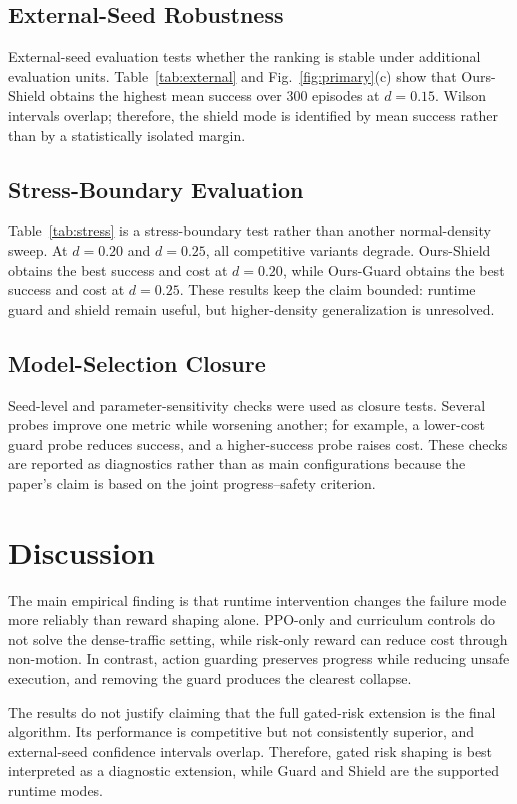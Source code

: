 \documentclass[conference,a4paper]{IEEEtran}
\begin{document}
\subsection{External-Seed Robustness}
External-seed evaluation tests whether the ranking is stable under additional evaluation units. Table~\ref{tab:external} and Fig.~\ref{fig:primary}(c) show that Ours-Shield obtains the highest mean success over 300 episodes at $d=0.15$. Wilson intervals overlap; therefore, the shield mode is identified by mean success rather than by a statistically isolated margin.


\subsection{Stress-Boundary Evaluation}
Table~\ref{tab:stress} is a stress-boundary test rather than another normal-density sweep. At $d=0.20$ and $d=0.25$, all competitive variants degrade. Ours-Shield obtains the best success and cost at $d=0.20$, while Ours-Guard obtains the best success and cost at $d=0.25$. These results keep the claim bounded: runtime guard and shield remain useful, but higher-density generalization is unresolved.


\subsection{Model-Selection Closure}
Seed-level and parameter-sensitivity checks were used as closure tests. Several probes improve one metric while worsening another; for example, a lower-cost guard probe reduces success, and a higher-success probe raises cost. These checks are reported as diagnostics rather than as main configurations because the paper's claim is based on the joint progress--safety criterion.
\FloatBarrier

\section{Discussion}
The main empirical finding is that runtime intervention changes the failure mode more reliably than reward shaping alone. PPO-only and curriculum controls do not solve the dense-traffic setting, while risk-only reward can reduce cost through non-motion. In contrast, action guarding preserves progress while reducing unsafe execution, and removing the guard produces the clearest collapse.

The results do not justify claiming that the full gated-risk extension is the final algorithm. Its performance is competitive but not consistently superior, and external-seed confidence intervals overlap. Therefore, gated risk shaping is best interpreted as a diagnostic extension, while Guard and Shield are the supported runtime modes.
\end{document}
